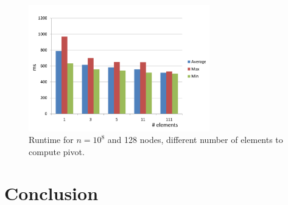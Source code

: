 \documentclass[11pt,a4paper]{article}
\begin{document}
\begin{figure}[h]
	\includegraphics[width=0.7\textwidth]{img/mpi_pivot.pdf}
	\caption{Runtime for $n=10^{8}$ and 128 nodes, different number of elements to compute pivot.}
\end{figure}
\section{Conclusion}
\end{document}
